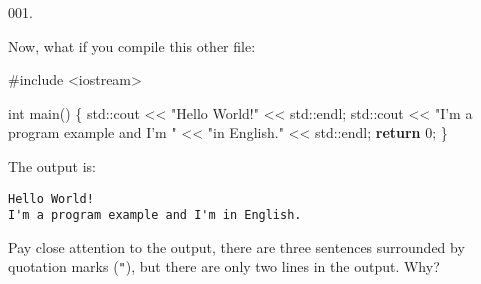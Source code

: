 \documentclass[]{article}
\newenvironment{Shaded}{}{}
\newcommand{\BuiltInTok}[1]{#1}
\newcommand{\ControlFlowTok}[1]{\textcolor[rgb]{0.00,0.44,0.13}{\textbf{#1}}}
\newcommand{\DataTypeTok}[1]{\textcolor[rgb]{0.56,0.13,0.00}{#1}}
\newcommand{\DecValTok}[1]{\textcolor[rgb]{0.25,0.63,0.44}{#1}}
\newcommand{\ImportTok}[1]{#1}
\newcommand{\NormalTok}[1]{#1}
\newcommand{\PreprocessorTok}[1]{\textcolor[rgb]{0.74,0.48,0.00}{#1}}
\newcommand{\StringTok}[1]{\textcolor[rgb]{0.25,0.44,0.63}{#1}}
\begin{document}
\vspace{2mm}\noindent\hrulefill{}

\noindent
{\tiny 001.}\\
\begin{minipage}[t]{.485\linewidth}

Now, what if you compile this other file:

\begin{framed}

\begin{Shaded}
\begin{Highlighting}[]
\PreprocessorTok{#include }\ImportTok{<iostream>}

\DataTypeTok{int}\NormalTok{ main()}
\NormalTok{\{}
  \BuiltInTok{std::}\NormalTok{cout << }\StringTok{"Hello World!"}\NormalTok{ << }\BuiltInTok{std::}\NormalTok{endl;}
  \BuiltInTok{std::}\NormalTok{cout << }\StringTok{"I'm a program example and I'm "}
\NormalTok{            << }\StringTok{"in English."}
\NormalTok{            << }\BuiltInTok{std::}\NormalTok{endl;}
  \ControlFlowTok{return} \DecValTok{0}\NormalTok{;}
\NormalTok{\}}
\end{Highlighting}
\end{Shaded}

\end{framed}

\end{minipage}
\hfill
\begin{minipage}[t]{.485\linewidth}

The output is:

\begin{framed}

\begin{verbatim}
Hello World!
I'm a program example and I'm in English.
\end{verbatim}

\end{framed}

Pay close attention to the output, there are three sentences surrounded
by quotation marks (\texttt{"}), but there are only two lines in the
output. Why?

\end{minipage}

\vspace{2mm}\noindent\hrulefill{}
\end{document}

